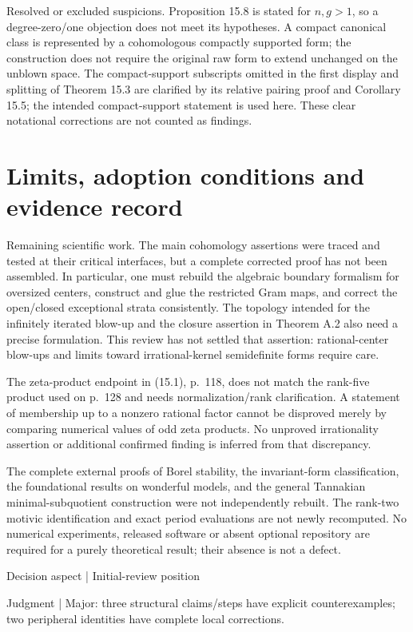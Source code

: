 \documentclass[10pt]{article}
\begin{document}
Resolved or excluded suspicions. Proposition 15.8 is stated for \(n,g>1\), so a degree-zero/one objection does not meet its hypotheses. A compact canonical class is represented by a cohomologous compactly supported form; the construction does not require the original raw form to extend unchanged on the unblown space. The compact-support subscripts omitted in the first display and splitting of Theorem 15.3 are clarified by its relative pairing proof and Corollary 15.5; the intended compact-support statement is used here. These clear notational corrections are not counted as findings.\par
\section*{Limits, adoption conditions and evidence record}
Remaining scientific work. The main cohomology assertions were traced and tested at their critical interfaces, but a complete corrected proof has not been assembled. In particular, one must rebuild the algebraic boundary formalism for oversized centers, construct and glue the restricted Gram maps, and correct the open/closed exceptional strata consistently. The topology intended for the infinitely iterated blow-up and the closure assertion in Theorem A.2 also need a precise formulation. This review has not settled that assertion: rational-center blow-ups and limits toward irrational-kernel semidefinite forms require care.\par
The zeta-product endpoint in (15.1), p. 118, does not match the rank-five product used on p. 128 and needs normalization/rank clarification. A statement of membership up to a nonzero rational factor cannot be disproved merely by comparing numerical values of odd zeta products. No unproved irrationality assertion or additional confirmed finding is inferred from that discrepancy.\par
The complete external proofs of Borel stability, the invariant-form classification, the foundational results on wonderful models, and the general Tannakian minimal-subquotient construction were not independently rebuilt. The rank-two motivic identification and exact period evaluations are not newly recomputed. No numerical experiments, released software or absent optional repository are required for a purely theoretical result; their absence is not a defect.\par
Decision aspect | Initial-review position\par
Judgment | Major: three structural claims/steps have explicit counterexamples; two peripheral identities have complete local corrections.\par
\end{document}

